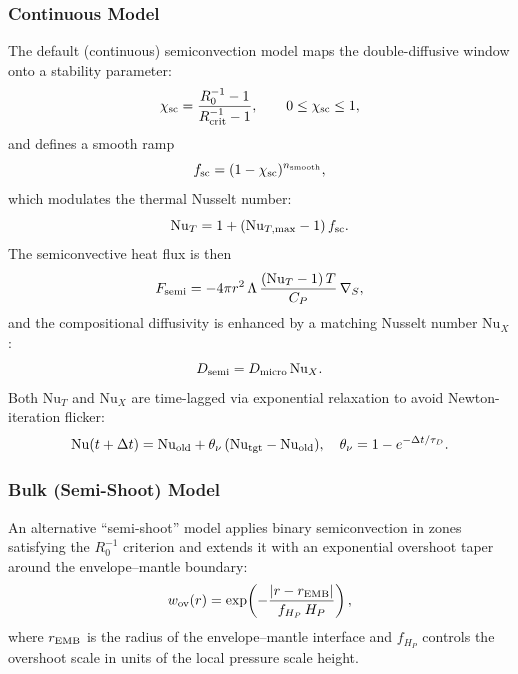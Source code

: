 \documentclass{aastex631}
\newcommand{\Hp}{H_P}
\newcommand{\Cp}{C_P}
\begin{document}
\subsubsection{Continuous Model}

The default (continuous) semiconvection model maps the double-diffusive
window onto a stability parameter:
\begin{equation}
  \chi_{\rm sc}
  = \frac{R_0^{-1} - 1}{R_{\rm crit}^{-1} - 1},
  \qquad 0\le\chi_{\rm sc}\le 1,
\end{equation}
and defines a smooth ramp
\begin{equation}
  f_{\rm sc} = (1 - \chi_{\rm sc})^{n_{\rm smooth}},
\end{equation}
which modulates the thermal Nusselt number:
\begin{equation}
  \mathrm{Nu}_T = 1 + (\mathrm{Nu}_{T,\max} - 1)\,f_{\rm sc}.
\end{equation}
The semiconvective heat flux is then
\begin{equation}\label{eq:Fsemi}
  F_{\rm semi}
  = -4\pi r^2\,\Lambda\,\frac{(\mathrm{Nu}_T - 1)\,T}{\Cp}
    \,\nabla_S,
\end{equation}
and the compositional diffusivity is enhanced by a matching Nusselt
number $\mathrm{Nu}_X$:
\begin{equation}
  D_{\rm semi} = D_{\rm micro}\,\mathrm{Nu}_X.
\end{equation}
Both $\mathrm{Nu}_T$ and $\mathrm{Nu}_X$ are time-lagged via exponential
relaxation to avoid Newton-iteration flicker:
\begin{equation}
  \mathrm{Nu}(t+\Delta t)
  = \mathrm{Nu}_{\rm old}
  + \theta_\nu\,(\mathrm{Nu}_{\rm tgt} - \mathrm{Nu}_{\rm old}),
  \quad
  \theta_\nu = 1 - e^{-\Delta t/\tau_D}.
\end{equation}

\subsubsection{Bulk (Semi-Shoot) Model}

An alternative ``semi-shoot'' model applies binary semiconvection in
zones satisfying the $R_0^{-1}$ criterion and extends it with an
exponential overshoot taper around the envelope--mantle boundary:
\begin{equation}
  w_{\rm ov}(r)
  = \exp\!\left(-\frac{|r - r_{\rm EMB}|}{f_{\Hp}\,\Hp}\right),
\end{equation}
where $r_{\rm EMB}$ is the radius of the envelope--mantle interface and
$f_{\Hp}$ controls the overshoot scale in units of the local pressure
scale height.
\end{document}
